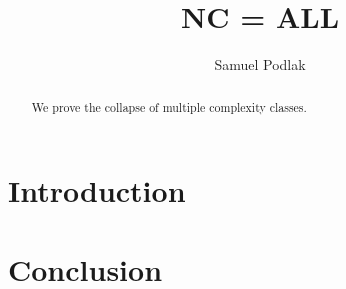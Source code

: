 \documentclass[a4paper]{amsart}
\title{NC = ALL}
\author{Samuel Podlak}
\theoremstyle{remark}
\theoremstyle{definition}
\begin{document}
\begin{abstract}
We prove the collapse of multiple complexity classes. 

\end{abstract}

\maketitle

\section{Introduction}



\section{}

\begin{figure}
	\centering
	\caption{}
\end{figure}

\section{}



\section{Conclusion}







\end{document}
